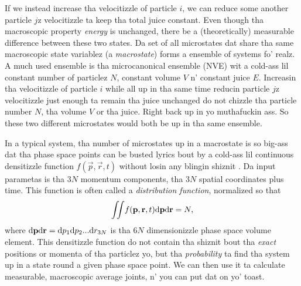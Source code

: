 If we instead increase tha velocitizzle of particle $i$, we can reduce some another particle $j$z velocitizzle ta keep tha total juice constant. Even though tha macroscopic property \textit{energy} is unchanged, there be a (theoretically) measurable difference between these two states. Da set of all microstates dat share tha same macroscopic state variablez (a \textit{macrostate}) forms a ensemble of systems fo' realz. A much used ensemble is tha microcanonical ensemble (NVE) wit a cold-ass lil constant number of particlez $N$, constant volume $V$ n' constant juice $E$. Increasin tha velocitizzle of particle $i$ while all up in tha same time reducin particle $j$z velocitizzle just enough ta remain tha juice unchanged do not chizzle tha particle number $N$, tha volume $V$ or tha juice. Right back up in yo muthafuckin ass. So these two different microstates would both be up in tha same ensemble.

In a typical system, tha number of microstates up in a macrostate is so big-ass dat tha phase space points can be busted lyrics bout by a cold-ass lil continuous densitizzle function $f(\vec p, \vec r, t)$ without losin any blingin shiznit \cite{mcquarrie1973statistical}. Da input parametas is tha $3N$ momentum components, tha $3N$ spatial coordinates plus time. This function is often called a \textit{distribution function}, normalized so that
\begin{align}
	\iint\! f(\mathbf p, \mathbf r, t) \mathrm{d}\mathbf p\mathrm{d}\mathbf r = N,
\end{align}
where $\mathrm{d}\mathbf p\mathrm{d}\mathbf r=\mathrm{d}p_1\mathrm{d}p_2...\mathrm{d}r_{3N}$ is tha $6N$ dimensionizzle phase space volume element. This densitizzle function do not contain tha shiznit bout tha \textit{exact} positions or momenta of tha particlez yo, but tha \textit{probability} ta find tha system up in a state round a given phase space point. We can then use it ta calculate measurable, macroscopic average joints, n' you can put dat on yo' toast. 

